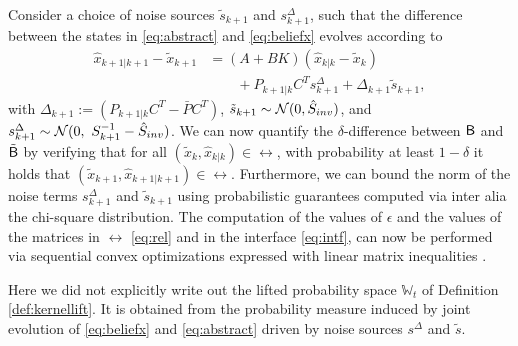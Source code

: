 \documentclass{ifacconf}
\newcommand{\red}[1]{{\color{red} #1}}
\renewcommand{\axx}[1]{{\color{orange} Ali: #1}}
\begin{document}
Consider a choice of noise sources $\tilde{{s}}_{k+1}$ and $s^\Delta_{k+1}$, such that the difference between the states in \eqref{eq:abstract} and \eqref{eq:beliefx} evolves according to
\begin{equation}
\begin{aligned}
 \hat x_{k+1|k+1}-  \tilde x_{k+1}&=(A+BK)(\hat x_{k|k}-\tilde x_{k})  \\ & \qquad + P_{k+1|k}C^T s^\Delta_{k+1}+\Delta_{k+1} {\tilde{s}}_{k+1},
\end{aligned}
\end{equation}
with $\Delta_{k+1}:=(P_{k+1|k}C^T-  \bar P C^T)$, $ \tilde{{s}}_{k+1}\sim \mathcal{N} (0,\hat{S}_{inv})$, and $ {s}^\Delta_{k+1}\sim  \mathcal{N} (0,\  S_{k+1}^{-1}-\hat{S}_{inv})$.
We can now quantify the $\delta$-difference between $\mathsf{B}$ and $\tilde {\mathsf{B}}$ by verifying that for all  $(\tilde x_k,\hat x_{k|k})\in \rel$, with probability at least $1-\delta$ it holds that $(\tilde x_{k+1},\hat x_{k+1|k+1})\in \rel$. %
Furthermore, we can bound the norm of the noise terms ${s}^\Delta_{k+1}$ and $ \tilde{{s}}_{k+1}$ using probabilistic guarantees computed via inter alia the chi-square distribution. The computation of the values of $\epsilon$ and the values of the matrices  in $\rel$ \eqref{eq:rel} and in the interface \eqref{eq:intf}, can now be performed via sequential convex optimizations expressed with linear matrix inequalities \cite{haesaert2017verification}.


\begin{remark}
  Here we did not explicitly write out the lifted probability space $\mathbb{W}_t$ of Definition \ref{def:kernellift}. It is obtained from the probability measure induced by joint evolution of \eqref{eq:beliefx} and \eqref{eq:abstract} driven by noise sources $s^\Delta$ and $ {\tilde{s}} $.
 \end{remark}
\end{document}
